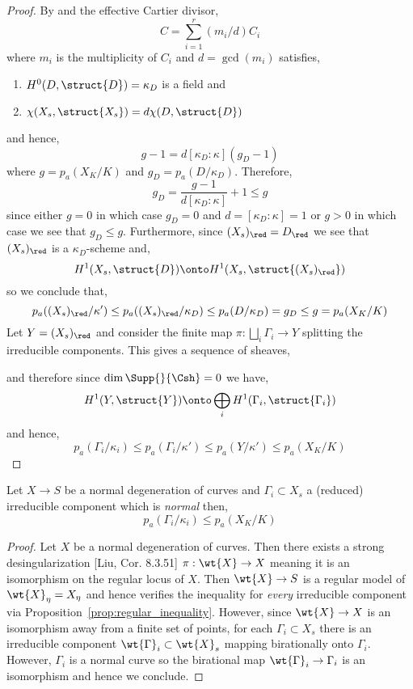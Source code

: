 \documentclass[12pt]{article}
\begin{document}
\begin{proof}
By  and  the effective Cartier divisor,
\[ C = \sum_{i = 1}^r (m_i / d) C_i \]
where $m_i$ is the multiplicity of $C_i$ and $d = \gcd(m_i)$ satisfies,
\begin{enumerate}
\item $H^0(D, \struct{D}) = \kappa_D$ is a field and
\item $\chi(X_s, \struct{X_s}) = d \chi(D, \struct{D})$ 
\end{enumerate}
and hence,
\[ g - 1 = d [\kappa_D : \kappa] (g_D - 1) \]
where $g = p_a(X_K/K)$ and $g_D = p_a(D/\kappa_D)$. Therefore,
\[  g_D = \frac{g-1}{d [\kappa_D : \kappa]} + 1 \le g \]
since either $g = 0$ in which case $g_D = 0$ and $d = [\kappa_D : \kappa] = 1$ or $g > 0$ in which case we see that $g_D \le g$. Furthermore, since $(X_s)_{\red} = D_{\red}$ we see that $(X_s)_{\red}$ is a $\kappa_D$-scheme and,
\[ H^1(X_s, \struct{D}) \onto H^1(X_s, \struct{(X_s)_{\red}}) \]
so we conclude that,
\[ p_a((X_s)_{\red}/\kappa') \le p_a((X_s)_{\red}/\kappa_D) \le p_a(D/\kappa_D) = g_D \le g = p_a(X_K/K) \]
Let $Y = (X_s)_{\red}$ and consider the finite map $\pi : \bigsqcup_i \Gamma_i \to Y$ splitting the irreducible components. This gives a sequence of sheaves,
\begin{center}
\end{center}
and therefore since $\dim{\Supp{}{\Csh}} = 0$ we have,
\[ H^1(Y, \struct{Y}) \onto \bigoplus_{i} H^1(\Gamma_i, \struct{\Gamma_i}) \]
and hence,
\[ p_a(\Gamma_i/\kappa_i) \le p_a(\Gamma_i / \kappa') \le p_a(Y/\kappa') \le p_a(X_K/K) \]
\end{proof}

\begin{prop} \label{prop:normal_inequality}
Let $X \to S$ be a normal degeneration of curves and $\Gamma_i \subset X_s$ a (reduced) irreducible component which is \textit{normal} then,
\[ p_a(\Gamma_i / \kappa_i) \le p_a(X_K/K) \]
\end{prop}

\begin{proof}
Let $X$ be a normal degeneration of curves. Then there exists a strong desingularization [Liu, Cor. 8.3.51] $\pi : \wt{X} \to X$ meaning it is an isomorphism on the regular locus of $X$. Then $\wt{X} \to S$ is a regular model of $\wt{X}_\eta = X_\eta$ and hence verifies the inequality for \textit{every} irreducible component via Proposition~\ref{prop:regular_inequality}. However, since $\wt{X} \to X$ is an isomorphism away from a finite set of points, for each $\Gamma_i \subset X_s$ there is an irreducible component $\wt{\Gamma}_i \subset \wt{X}_s$ mapping birationally onto $\Gamma_i$. However, $\Gamma_i$ is a normal curve so the birational map $\wt{\Gamma}_i \to \Gamma_i$ is an isomorphism and hence we conclude.
\end{proof}
\end{document}
